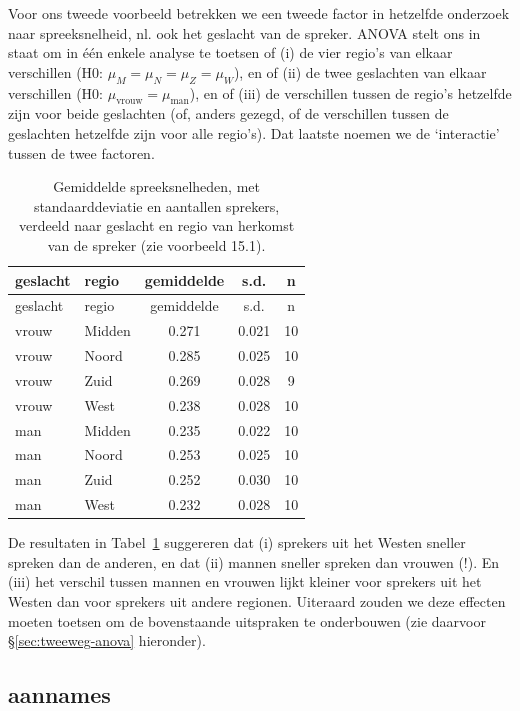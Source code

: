 \documentclass[
]{book}
\begin{document}
Voor ons tweede voorbeeld betrekken we een tweede factor in hetzelfde
onderzoek naar spreeksnelheid, nl. ook het geslacht van de spreker.
ANOVA stelt ons in staat om in één enkele analyse te toetsen of (i) de vier
regio's van elkaar verschillen (H0: \(\mu_M = \mu_N = \mu_Z = \mu_W\)), en
of (ii) de twee geslachten van elkaar verschillen (H0:
\(\mu_\textrm{vrouw} = \mu_\textrm{man}\)), en of (iii) de verschillen
tussen de regio's hetzelfde zijn voor beide geslachten (of, anders
gezegd, of de verschillen tussen de geslachten hetzelfde zijn voor alle
regio's). Dat laatste noemen we de `interactie' tussen de twee factoren.

\begin{longtable}[]{@{}llccc@{}}
\caption{\label{tab:syldur2way} Gemiddelde spreeksnelheden, met standaarddeviatie en aantallen sprekers, verdeeld naar geslacht en regio van herkomst van de spreker (zie voorbeeld 15.1).}\tabularnewline
\toprule\noalign{}
geslacht & regio & gemiddelde & s.d. & n \\
\midrule\noalign{}
\endfirsthead
\toprule\noalign{}
geslacht & regio & gemiddelde & s.d. & n \\
\midrule\noalign{}
\endhead
\bottomrule\noalign{}
\endlastfoot
vrouw & Midden & 0.271 & 0.021 & 10 \\
vrouw & Noord & 0.285 & 0.025 & 10 \\
vrouw & Zuid & 0.269 & 0.028 & 9 \\
vrouw & West & 0.238 & 0.028 & 10 \\
man & Midden & 0.235 & 0.022 & 10 \\
man & Noord & 0.253 & 0.025 & 10 \\
man & Zuid & 0.252 & 0.030 & 10 \\
man & West & 0.232 & 0.028 & 10 \\
\end{longtable}

De resultaten in Tabel~\ref{tab:syldur2way} suggereren dat (i) sprekers uit het Westen
sneller spreken dan de anderen, en dat (ii) mannen sneller spreken dan
vrouwen (!). En (iii) het verschil tussen mannen en vrouwen lijkt
kleiner voor sprekers uit het Westen dan voor sprekers uit andere
regionen. Uiteraard zouden we deze effecten moeten toetsen om de bovenstaande uitspraken te onderbouwen (zie daarvoor §\ref{sec:tweeweg-anova} hieronder).

\subsection{aannames}\label{aannames}
\end{document}
